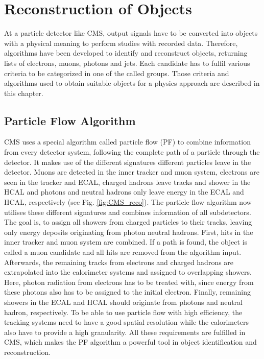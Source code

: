 \chapter{Reconstruction of Objects}
\label{ch:Reco}
	At a particle detector like CMS, output signals have to be converted into objects with a physical meaning to perform studies with recorded data. Therefore, algorithms have been developed to identify and reconstruct objects, returning lists of electrons, muons, photons and jets. Each candidate has to fulfil various criteria to be categorized in one of the called groups. Those criteria and algorithms used to obtain suitable objects for a physics approach are described in this chapter.

\section{Particle Flow Algorithm}
\label{sec:pf}
	CMS uses a special algorithm called particle flow (PF) \cite{particleflow} to combine information from every detector system, following the complete path of a particle through the detector. It makes use of the different signatures different particles leave in the detector. Muons are detected in the inner tracker and muon system, electrons are seen in the tracker and ECAL, charged hadrons leave tracks and shower in the HCAL and photons and neutral hadrons only leave energy in the ECAL and HCAL, respectively (see Fig. \ref{fig:CMS_reco}). The particle flow algorithm now utilises these different signatures and combines information of all subdetectors. The goal is, to assign all showers from charged particles to their tracks, leaving only energy deposits originating from photon neutral hadrons. First, hits in the inner tracker and muon system are combined. If a path is found, the object is called a muon candidate and all hits are removed from the algorithm input. Afterwards, the remaining tracks from electrons and charged hadrons are extrapolated into the calorimeter systems and assigned to overlapping showers. Here, photon radiation from electrons has to be treated with, since energy from these photons also has to be assigned to the initial electron. Finally, remaining showers in the ECAL and HCAL should originate from photons and neutral hadron, respectively.	To be able to use particle flow with high efficiency, the tracking systems need to have a good spatial resolution while the calorimeters also have to provide a high granularity. All these requirements are fulfilled in CMS, which makes the PF algorithm a powerful tool in object identification and reconstruction.

